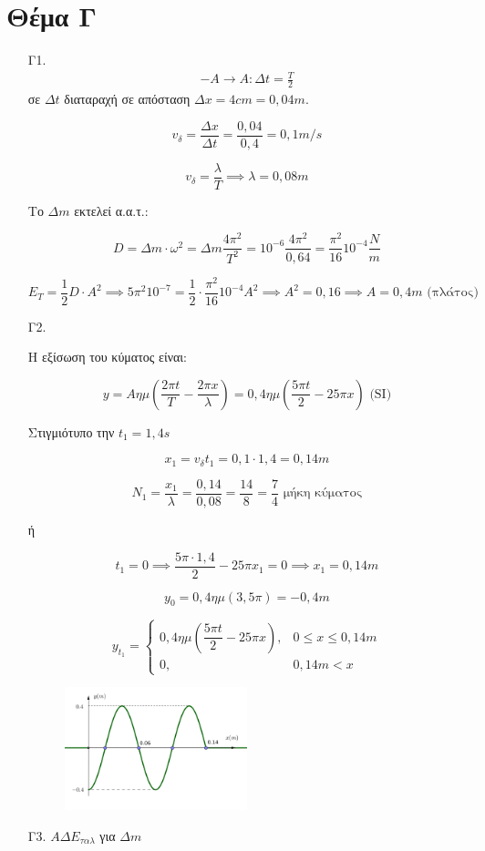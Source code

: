 \documentclass[12pt]{article}
\begin{document}
  \section*{Θέμα Γ}
  \begin{enumerate}
    \item [Γ1.]
      \begin{gather*}
        -A \to A: Δt=\frac{T}{2}
      \end{gather*}
      σε $Δt$ διαταραχή σε απόσταση $Δx=4cm=0,04m$.

      $$v_δ=\frac{Δx}{Δt}=\frac{0,04}{0,4}=0,1m/s$$

      $$v_δ=\frac{λ}{T}\implies λ=0,08m$$

      Το $Δm$ εκτελεί α.α.τ.:

      $$D=Δm\cdot ω^2=Δm\frac{4\pi^2}{T^2}=10^{-6}\frac{4\pi^2}{0,64}=\frac{\pi^2}{16}10^{-4}\frac{N}{m}$$

      $$E_T=\frac{1}{2}D\cdot A^2\implies 5\pi^2 10^{-7}=\frac{1}{2}\cdot\frac{\pi^2}{16}10^{-4}A^2\implies A^2=0,16\implies A=0,4m \text{ (πλάτος)}$$

    \item [Γ2.]

    Η εξίσωση του κύματος είναι:

    $$y=Aημ\left(\frac{2\pi t}{T}-\frac{2\pi x}{λ}\right)=0,4ημ\left(\frac{5\pi t}{2}-25\pi x \right) \text{ (SI)}$$

    Στιγμιότυπο την $t_1=1,4s$

    $$x_1=v_δ t_1=0,1\cdot 1,4=0,14m$$

    $$N_1=\frac{x_1}{λ}=\frac{0,14}{0,08}=\frac{14}{8}=\frac{7}{4} \text{ μήκη κύματος}$$

    ή

    $$t_1=0\implies \frac{5\pi \cdot 1,4}{2}-25\pi x_1=0\implies x_1=0,14m$$

    $$y_0=0,4ημ(3,5\pi)=-0,4m$$

    $$y_{t_1}=\begin{cases}
      0,4ημ\left(\dfrac{5\pi t}{2}-25\pi x \right), & 0\le x\le 0,14m \\
      0, & 0,14m < x
    \end{cases}$$

        \begin{figure}[h]
          \includegraphics[width=0.5\textwidth]{ΦυσικήΓ2.png}
          \centering
        \end{figure}
    \item [Γ3.]
      $ΑΔΕ_{ταλ}$ για $Δm$


\end{enumerate}
\end{document}
